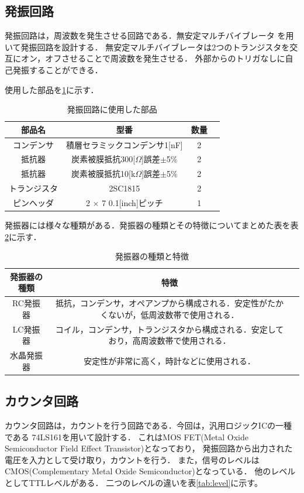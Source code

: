 \documentclass[a4paper,11pt,dvipdfmx]{jsarticle}
\begin{document}
\subsection{発振回路}
発振回路は，周波数を発生させる回路である．無安定マルチバイブレータ
を用いて発振回路を設計する．
無安定マルチバイブレータは2つのトランジスタを交互にオン，オフさせることで周波数を発生させる．
外部からのトリガなしに自己発振することができる．\cite{densi}

使用した部品を\ref{tab:oscillationparts}に示す．
\begin{table}[H]
  \centering
  \caption{発振回路に使用した部品}
  \begin{tabular}{|c|c|c|c|}
    \hline
    部品名 & 型番 & 数量  \\
    \hline
    コンデンサ & 積層セラミックコンデンサ1[nF] & 2  \\
    抵抗器 & 炭素被膜抵抗300[$\Omega$]誤差$\pm$5\% & 2 \\
    抵抗器 & 炭素被膜抵抗10[k$\Omega$]誤差$\pm$5\% & 2 \\
    トランジスタ & 2SC1815 & 2  \\
    ピンヘッダ & 2 $\times$ 7 0.1[inch]ピッチ & 1  \\
    \hline
  \end{tabular}
  \label{tab:oscillationparts}
\end{table}

発振器には様々な種類がある．発振器の種類とその特徴についてまとめた表を表\ref{tab:oscillation}に示す．\cite{densi}

\begin{table}[H]
  \centering
  \caption{発振器の種類と特徴}
  \begin{tabular}{|c|c|c|}
    \hline
    発振器の種類 & 特徴  \\
    \hline
    RC発振器 & 抵抗，コンデンサ，オペアンプから構成される．安定性がたかくないが，低周波数帯で使用される．  \\
    LC発振器 & コイル，コンデンサ，トランジスタから構成される．安定しており，高周波数帯で使用される．  \\
    水晶発振器 & 安定性が非常に高く，時計などに使用される．  \\
    \hline
  \end{tabular}
  \label{tab:oscillation}
\end{table}




\subsection{カウンタ回路}
カウンタ回路は，カウントを行う回路である．今回は，汎用ロジックICの一種である
74LS161を用いて設計する．
これはMOS FET(Metal Oxide Semiconductor Field Effect Transistor)となっており，
発振回路から出力された電圧を入力として受け取り，カウントを行う．
また，信号のレベルはCMOS(Complementary Metal Oxide Semiconductor)となっている．
他のレベルとしてTTLレベルがある．
二つのレベルの違いを表\ref{tab:level}に示す。\cite{digital}
\end{document}
